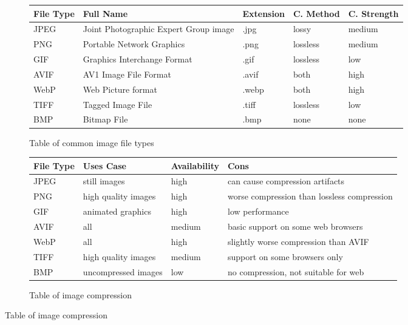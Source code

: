 \documentclass{article}
\begin{document}
\begin{figure}[h]
\begin{subfigure}{\textwidth}
\caption{Table of common image file types}
\begin{tabular}{l l l l l}
\toprule
File Type & Full Name                             & Extension & C. Method & C. Strength \\
\midrule
JPEG      & Joint Photographic Expert Group image & .jpg      & lossy     & medium \\
PNG       & Portable Network Graphics             & .png      & lossless  & medium \\
GIF       & Graphics Interchange Format           & .gif      & lossless  & low \\
AVIF      & AV1 Image File Format                 & .avif     & both      & high \\
WebP      & Web Picture format                    & .webp     & both      & high \\
TIFF      & Tagged Image File                     & .tiff     & lossless  & low \\
BMP       & Bitmap File                           & .bmp      & none      & none \\
\bottomrule
\end{tabular}
\end{subfigure}

\begin{subfigure}{\textwidth}
\centering
\caption{Table of image compression}
\begin{tabular}{l l l l}
\toprule
File Type & Uses Case           & Availability & Cons \\
\midrule
JPEG      & still images        & high         & can cause compression artifacts              \\
PNG       & high quality images & high         & worse compression than lossless compression  \\
GIF       & animated graphics   & high         & low performance                              \\
AVIF      & all                 & medium       & basic support on some web browsers           \\
WebP      & all                 & high         & slightly worse compression than AVIF         \\
TIFF      & high quality images & medium       & support on some browsers only                \\
BMP       & uncompressed images & low          & no compression, not suitable for web         \\
\bottomrule
\end{tabular}
\end{subfigure}
\end{figure}
\end{document}
